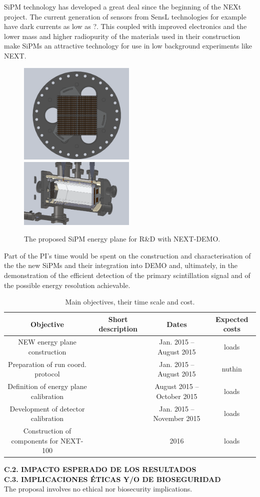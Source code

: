 \documentclass[a4paper,11pt,oneside]{article}
\begin{document}
SiPM technology has developed a great deal since the beginning of the
NEXt project. The current generation of sensors from SensL
technologies for example have dark currents as low as ?. This coupled
with improved electronics and the lower mass and higher radiopurity of
the materials used in their construction make SiPMs an attractive
technology for use in low background experiments like NEXT.
\begin{figure}
  \begin{center}
    \includegraphics[width=0.495\textwidth]{img/siliEng}
    \includegraphics[width=0.495\textwidth]{img/siliNEXT}
  \end{center}
  \caption{The proposed SiPM energy plane for R\&D with NEXT-DEMO.}
  \label{fig:siliNEXT}
\end{figure}
Part of the PI's time would be spent on the construction and
characterisation of the the new SiPMs and their integration into DEMO
and, ultimately, in the demonstration of the efficient detection of
the primary scintillation signal and of the possible energy resolution
achievable.
\begin{table}
  \begin{center}
    \begin{tabular}{c|c|c|c}
      \hline
      Objective & Short description & Dates & Expected costs\\
      \hline
      NEW energy plane construction & & Jan. 2015 -- August 2015 &
      loads\\
      Preparation of run coord. protocol & & Jan. 2015 -- August 2015
      & nuthin\\
      Definition of energy plane calibration & & August 2015 --
      October 2015 & loads\\
      Development of detector calibration & & Jan. 2015 -- November
      2015 & loads\\
      Construction of components for NEXT-100 & & 2016 & loads
    \end{tabular}
  \end{center}
  \caption{Main objectives, their time scale and cost.}
\end{table}

\noindent\textbf{C.2. IMPACTO ESPERADO DE LOS RESULTADOS}\\


\noindent\textbf{C.3. IMPLICACIONES \'ETICAS Y/O DE BIOSEGURIDAD}\\
The proposal involves no ethical nor biosecurity implications.
\end{document}

